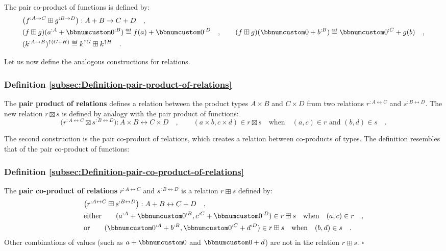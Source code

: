 The pair co-product of functions
is defined by:
\begin{align*}
 & \big(f^{:A\rightarrow C}\boxplus g^{:B\rightarrow D}\big):A+B\rightarrow C+D\quad,\\
 & (f\boxplus g)(a^{:A}+\bbnum 0^{:B})\triangleq f(a)+\bbnum 0^{:D}\quad,\quad\quad(f\boxplus g)(\bbnum 0+b^{:B})\triangleq\bbnum 0^{:C}+g(b)\quad,\\
 & (k^{:A\rightarrow B})^{\uparrow(G+H)}\triangleq k^{\uparrow G}\boxplus k^{\uparrow H}\quad.
\end{align*}

Let us now define the analogous constructions for relations.

\subsubsection{Definition \label{subsec:Definition-pair-product-of-relations}\ref{subsec:Definition-pair-product-of-relations}}

The \textbf{pair product of relations}
defines a relation between the product types $A\times B$ and $C\times D$
from two relations $r^{:A\leftrightarrow C}$ and $s^{:B\leftrightarrow D}$.
The new relation $r\boxtimes s$ is defined by analogy with the pair
product of functions:
\[
\big(r^{:A\leftrightarrow C}\boxtimes s^{:B\leftrightarrow D}\big):A\times B\leftrightarrow C\times D\quad,\quad\quad(a\times b,c\times d)\in r\boxtimes s\quad\text{when}\quad(a,c)\in r\text{ and }(b,d)\in s\quad.
\]

The second construction is the pair co-product of relations,
which creates a relation between co-products of types. The definition
resembles that of the pair co-product
of functions:

\subsubsection{Definition \label{subsec:Definition-pair-co-product-of-relations}\ref{subsec:Definition-pair-co-product-of-relations}}

The \textbf{pair co-product of relations} $r^{:A\leftrightarrow C}$
and $s^{:B\leftrightarrow D}$ is a relation $r\boxplus s$ defined
by:
\begin{align*}
 & \big(r^{:A\leftrightarrow C}\boxplus s^{:B\leftrightarrow D}\big):A+B\leftrightarrow C+D\quad,\\
 & \text{either}\quad\quad(a^{:A}+\bbnum 0^{:B},c^{:C}+\bbnum 0^{:D})\in r\boxplus s\quad\text{when}\quad(a,c)\in r\quad,\\
 & \text{or}\quad\quad(\bbnum 0^{:A}+b^{:B},\bbnum 0^{:C}+d^{:D})\in r\boxplus s\quad\text{when}\quad(b,d)\in s\quad.
\end{align*}
Other combinations of values (such as $a+\bbnum 0$ and $\bbnum 0+d$)
are not in the relation $r\boxplus s$. $\square$

